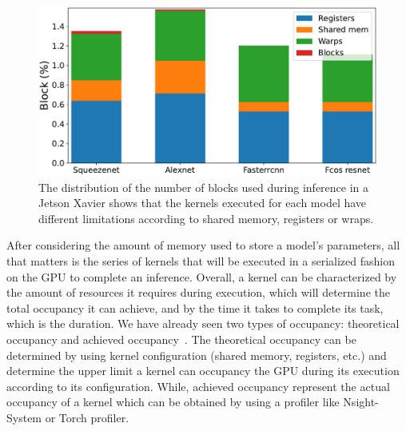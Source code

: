 \begin{figure}[t!]
	\centering
	\includegraphics[width=\linewidth]{chapters/roomie/images/launch__occupancy_limit_percentage_batch_size64.pdf}
	\caption{The distribution of the number of blocks used during inference in a Jetson Xavier shows that the kernels executed for each model have different limitations according to shared memory, registers or wraps.}
	\label{fig:occupancy_limit_percentage}
\end{figure}







After considering the amount of memory used to store a model's parameters, all that matters is the series of kernels that will be executed in a serialized fashion on the GPU to complete an inference. Overall, a kernel can be characterized by the amount of resources it requires during execution, which will determine the total occupancy it can achieve, and by the time it takes to complete its task, which is the duration. We have already seen two types of occupancy: theoretical occupancy and achieved occupancy~. The theoretical occupancy can be determined by using kernel configuration (shared memory, registers, etc.) and determine the upper limit a kernel can occupancy the GPU during its execution according to its configuration{\cite{lim2017autotuninggpukernelsstatic}}. While, achieved occupancy represent the actual occupancy of a kernel which can be obtained by using a profiler like Nsight-System or Torch profiler.

